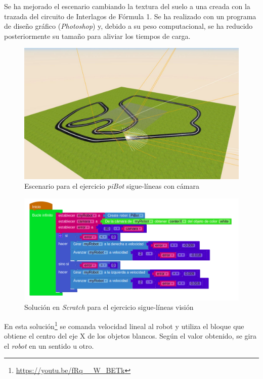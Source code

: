     Se ha mejorado el escenario cambiando la textura del suelo a una creada con la trazada del circuito de Interlagos de Fórmula 1. Se ha realizado con un programa de diseño gráfico (\textit{Photoshop}) y, debido a su peso computacional, se ha reducido posteriormente su tamaño para aliviar los tiempos de carga. 
    
    \begin{figure}[H]
    \centering
    \includegraphics[scale=0.4]{img/pibot_vision.JPG}
    \caption{Escenario para el ejercicio \textit{piBot} sigue-líneas con cámara} \label{fig:siguelineavision}
    \end{figure}
    
        \begin{figure}[H]
    \centering
    \includegraphics[scale=0.5]{img/siguelineasvisioncodigo.png}
    \caption{Solución en \textit{Scratch} para el ejercicio sigue-líneas visión} 
    \label{fig:visionSolution}
    \end{figure}
    
    En esta solución\footnote{\url{https://youtu.be/fRq__W_BETk}} se comanda velocidad lineal al robot y utiliza el bloque que obtiene el centro del eje X de los objetos blancos. Según el valor obtenido, se gira el \textit{robot} en un sentido u otro.
    
